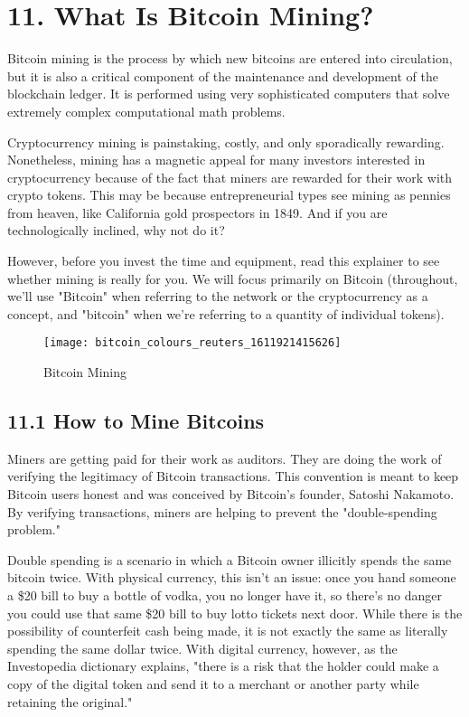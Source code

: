 \pagebreak
\section*{11. What Is Bitcoin Mining?}
Bitcoin mining is the process by which new bitcoins are entered into circulation, but it is also a critical component of the maintenance and development of the blockchain ledger. It is performed using very sophisticated computers that solve extremely complex computational math problems.\vspace{.3cm}

Cryptocurrency mining is painstaking, costly, and only sporadically rewarding. Nonetheless, mining has a magnetic appeal for many investors interested in cryptocurrency because of the fact that miners are rewarded for their work with crypto tokens. This may be because entrepreneurial types see mining as pennies from heaven, like California gold prospectors in 1849. And if you are technologically inclined, why not do it?\vspace{.3cm}

However, before you invest the time and equipment, read this explainer to see whether mining is really for you. We will focus primarily on Bitcoin (throughout, we'll use "Bitcoin" when referring to the network or the cryptocurrency as a concept, and "bitcoin" when we're referring to a quantity of individual tokens).\vspace{.3cm}

\begin{figure}[h]
	\centering
	\texttt{[image: bitcoin\_colours\_reuters\_1611921415626]}
	\captionsetup{labelformat=empty}
	\caption{Bitcoin Mining}
\end{figure}

\subsection*{11.1 How to Mine Bitcoins}

Miners are getting paid for their work as auditors. They are doing the work of verifying the legitimacy of Bitcoin transactions. This convention is meant to keep Bitcoin users honest and was conceived by Bitcoin's founder, Satoshi Nakamoto. By verifying transactions, miners are helping to prevent the "double-spending problem." \vspace{.3cm}

Double spending is a scenario in which a Bitcoin owner illicitly spends the same bitcoin twice. With physical currency, this isn't an issue: once you hand someone a \$20 bill to buy a bottle of vodka, you no longer have it, so there's no danger you could use that same \$20 bill to buy lotto tickets next door. While there is the possibility of counterfeit cash being made, it is not exactly the same as literally spending the same dollar twice. With digital currency, however, as the Investopedia dictionary explains, "there is a risk that the holder could make a copy of the digital token and send it to a merchant or another party while retaining the original."\vspace{.3cm}

